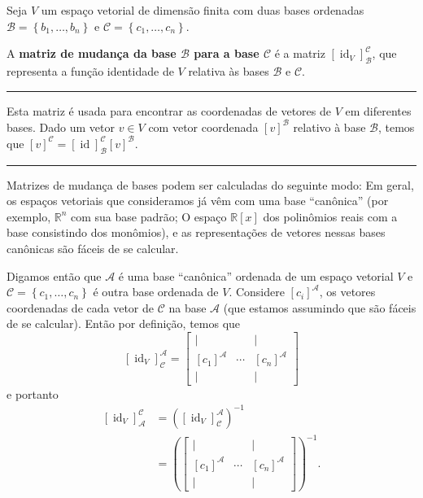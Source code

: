 \begin{definition}
	Seja $V$ um espaço vetorial de dimensão finita com duas bases ordenadas $\mathcal{B}=\left\{b_1,\ldots,b_n\right\}$ e $\mathcal{C}=\left\{c_1,\ldots,c_n\right\}$.
	
	A \textbf{matriz de mudança da base $\mathcal{B}$ para a base $\mathcal{C}$} é a matriz $[\operatorname{id}_V]_{\mathcal{B}}^{\mathcal{C}}$, que representa a função identidade de $V$ relativa às bases $\mathcal{B}$ e $\mathcal{C}$.
	
	\hrule
	
	Esta matriz é usada para encontrar as coordenadas de vetores de $V$ em diferentes bases. Dado um vetor $v\in V$ com vetor coordenada $[v]^{\mathcal{B}}$ relativo à base $\mathcal{B}$, temos que $[v]^\mathcal{C}=[\operatorname{id}]_{\mathcal{B}}^{\mathcal{C}}[v]^{\mathcal{B}}$.
\end{definition}

\hrule

Matrizes de mudança de bases podem ser calculadas do seguinte modo: Em geral, os espaços vetoriais que consideramos já vêm com uma base ``canônica'' (por exemplo, $\mathbb{R}^n$ com sua base padrão; O espaço $\mathbb{R}[x]$ dos polinômios reais com a base consistindo dos monômios), e as representações de vetores nessas bases canônicas são fáceis de se calcular.

Digamos então que $\mathcal{A}$ é uma base ``canônica'' ordenada de um espaço vetorial $V$ e $\mathcal{C}=\left\{c_1,\ldots,c_n\right\}$ é outra base ordenada de $V$. Considere $[c_i]^{\mathcal{A}}$, os vetores coordenadas de cada vetor de $\mathcal{C}$ na base $\mathcal{A}$ (que estamos assumindo que são fáceis de se calcular). Então por definição, temos que
\[\left[\operatorname{id}_V\right]_{\mathcal{C}}^{\mathcal{A}}=
	\begin{bmatrix}
		| & & | \\
		[c_1]^{\mathcal{A}} & \cdots & [c_n]^{\mathcal{A}} \\
		| & & |
	\end{bmatrix}\]
e portanto 
\begin{align*}
	\left[\operatorname{id}_V\right]_{\mathcal{A}}^\mathcal{C}
		&=\left(\left[\operatorname{id}_V\right]_{\mathcal{C}}^{\mathcal{A}}\right)^{-1}\\
		&=\left(\begin{bmatrix}
		| & & | \\
		[c_1]^{\mathcal{A}} & \cdots & [c_n]^{\mathcal{A}} \\
		| & & |
	\end{bmatrix}\right)^{-1}.
\end{align*}

